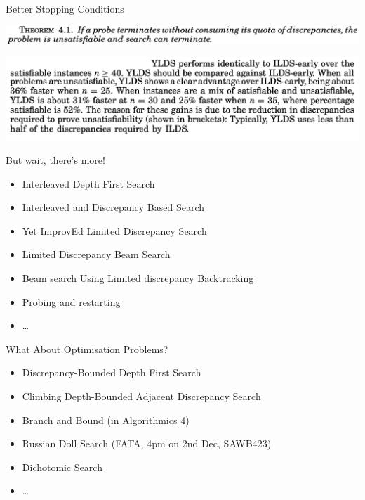 \documentclass{beamer}
\begin{document}
\begin{frame}{Better Stopping Conditions}

    \centering\includegraphics*[keepaspectratio=true,scale=0.2]{images/stopping-theorem.png}

    \vspace{2em}

    \centering\includegraphics*[keepaspectratio=true,scale=0.2]{images/stopping-result.png}

\end{frame}

\begin{frame}{But wait, there's more!}
    \begin{itemize}
        \item Interleaved Depth First Search
        \item Interleaved and Discrepancy Based Search
        \item Yet ImprovEd Limited Discrepancy Search
        \item Limited Discrepancy Beam Search
        \item Beam search Using Limited discrepancy Backtracking
        \item Probing and restarting
        \item \ldots
    \end{itemize}
\end{frame}

\begin{frame}{What About Optimisation Problems?}
    \begin{itemize}
        \item Discrepancy-Bounded Depth First Search
        \item Climbing Depth-Bounded Adjacent Discrepancy Search
        \item Branch and Bound (in Algorithmics 4)
        \item Russian Doll Search (FATA, 4pm on 2nd Dec, SAWB423)
        \item Dichotomic Search
        \item \ldots
    \end{itemize}
\end{frame}
\end{document}
